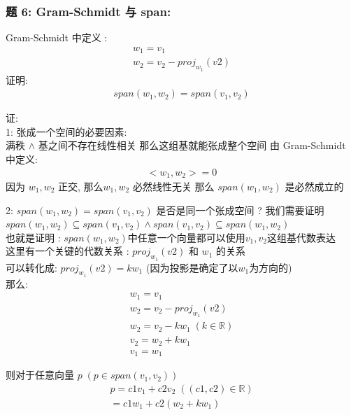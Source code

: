 \documentclass[12pt]{article}
\begin{document}
\begin{flushleft}
    \subsubsection{题 6: Gram-Schmidt 与 span:}
    Gram-Schmidt 中定义 : \\
    \begin{align}
        w_{1} = v_{1} \\
        w_{2} = v_{2} - proj_{w_{1}}(v2)
    \end{align}
    证明:
    \begin{align}
        span(w_{1}, w_{2}) =  span(v_{1},v_{2})
    \end{align}

    证: \\
    1: 张成一个空间的必要因素: \\
    满秩 $\land$ 基之间不存在线性相关 那么这组基就能张成整个空间
    由 Gram-Schmidt 中定义: \\
    \begin{align}
        <w_{1},w_{2}> = 0
    \end{align}
    因为 $w_{1}, w_{2}$ 正交, 那么$w_{1}, w_{2}$ 必然线性无关
    那么 $span(w_{1}, w_{2})$ 是必然成立的

    2: $span(w_{1}, w_{2}) =  span(v_{1},v_{2})$ 是否是同一个张成空间 ?
    我们需要证明 $span(w_{1}, w_{2}) \subseteq  span(v_{1},v_{2}) \land  span(v_{1},v_{2}) \subseteq span(w_{1}, w_{2})$ \\
    也就是证明 : $span(w_{1}, w_{2}) \text{中任意一个向量都可以使用} v_{1},v_{2} \text{这组基代数表达} $ \\

    这里有一个关键的代数关系 : $proj_{w_{1}}(v2)$ 和 $w_{1}$ 的关系 \\
    可以转化成: $proj_{w_{1}}(v2) = kw_{1}$ (因为投影是确定了以$w_{1}$为方向的) \\
    那么: \\
    \begin{align}
        w_{1} = v_{1}                                 \\
        w_{2} = v_{2} - proj_{w_{1}}(v2)              \\
        w_{2} = v_{2} - kw_{1} \;({k \in \mathbb{R}}) \\
        v_{2} = w_{2} + kw_{1}                        \\
        v_{1} = w_{1}
    \end{align}

    则对于任意向量 $p \;(p \in span(v_{1},v_{2}))$ \\
    \begin{align}
        p = c1v_{1} + c2v_{2} \;({(c1,c2) \in \mathbb{R}}) \\
        = c1w_{1} + c2(w_{2} + kw_{1})
    \end{align}


\end{flushleft}
\end{document}
